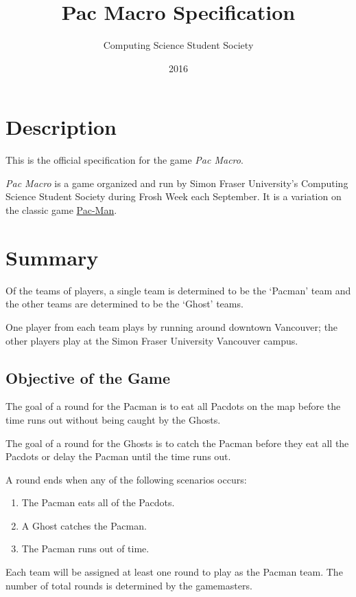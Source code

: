 \documentclass[10pt, oneside, letterpaper, titlepage]{article}
\title{Pac Macro Specification}
\author{Computing Science Student Society}
\date{2016}
\begin{document}
	\maketitle
	\clearpage
	\tableofcontents
	\clearpage

	\section{Description}
	\label{sec:description}

	This is the official specification for the game \emph{Pac Macro}.

	\emph{Pac Macro} is a game organized and run by Simon Fraser University's Computing Science Student Society during Frosh Week each September. It is a variation on the classic game \href{https://en.wikipedia.org/wiki/Pac-Man}{Pac-Man}.

	\section{Summary}
	\label{sec:summary}

	Of the teams of players, a single team is determined to be the `Pacman' team and the other teams are determined to be the `Ghost' teams.

	One player from each team plays by running around downtown Vancouver; the other players play at the Simon Fraser University Vancouver campus.

	\subsection{Objective of the Game}
	\label{subsec:summary:objective-of-the-game}

	The goal of a round for the Pacman is to eat all Pacdots on the map before the time runs out without being caught by the Ghosts.

	The goal of a round for the Ghosts is to catch the Pacman before they eat all the Pacdots or delay the Pacman until the time runs out.

	A round ends when any of the following scenarios occurs:
	\begin{enumerate}
		\item The Pacman eats all of the Pacdots.
		\item A Ghost catches the Pacman.
		\item The Pacman runs out of time.
	\end{enumerate}

	Each team will be assigned at least one round to play as the Pacman team. The number of total rounds is determined by the gamemasters.
\end{document}
